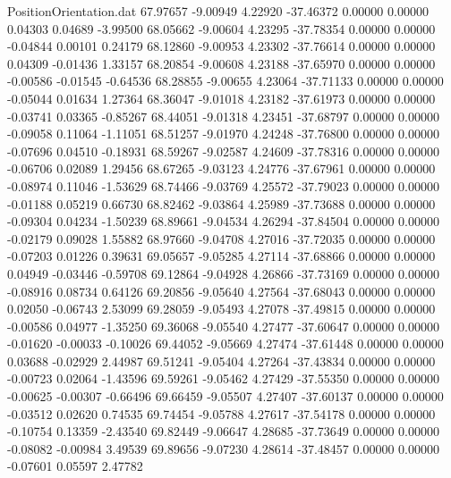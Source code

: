 \begin{filecontents}{PositionOrientation.dat}
  67.97657   -9.00949    4.22920   -37.46372    0.00000    0.00000    0.04303    0.04689   -3.99500
  68.05662   -9.00604    4.23295   -37.78354    0.00000    0.00000   -0.04844    0.00101    0.24179
  68.12860   -9.00953    4.23302   -37.76614    0.00000    0.00000    0.04309   -0.01436    1.33157
  68.20854   -9.00608    4.23188   -37.65970    0.00000    0.00000   -0.00586   -0.01545   -0.64536
  68.28855   -9.00655    4.23064   -37.71133    0.00000    0.00000   -0.05044    0.01634    1.27364
  68.36047   -9.01018    4.23182   -37.61973    0.00000    0.00000   -0.03741    0.03365   -0.85267
  68.44051   -9.01318    4.23451   -37.68797    0.00000    0.00000   -0.09058    0.11064   -1.11051
  68.51257   -9.01970    4.24248   -37.76800    0.00000    0.00000   -0.07696    0.04510   -0.18931
  68.59267   -9.02587    4.24609   -37.78316    0.00000    0.00000   -0.06706    0.02089    1.29456
  68.67265   -9.03123    4.24776   -37.67961    0.00000    0.00000   -0.08974    0.11046   -1.53629
  68.74466   -9.03769    4.25572   -37.79023    0.00000    0.00000   -0.01188    0.05219    0.66730
  68.82462   -9.03864    4.25989   -37.73688    0.00000    0.00000   -0.09304    0.04234   -1.50239
  68.89661   -9.04534    4.26294   -37.84504    0.00000    0.00000   -0.02179    0.09028    1.55882
  68.97660   -9.04708    4.27016   -37.72035    0.00000    0.00000   -0.07203    0.01226    0.39631
  69.05657   -9.05285    4.27114   -37.68866    0.00000    0.00000    0.04949   -0.03446   -0.59708
  69.12864   -9.04928    4.26866   -37.73169    0.00000    0.00000   -0.08916    0.08734    0.64126
  69.20856   -9.05640    4.27564   -37.68043    0.00000    0.00000    0.02050   -0.06743    2.53099
  69.28059   -9.05493    4.27078   -37.49815    0.00000    0.00000   -0.00586    0.04977   -1.35250
  69.36068   -9.05540    4.27477   -37.60647    0.00000    0.00000   -0.01620   -0.00033   -0.10026
  69.44052   -9.05669    4.27474   -37.61448    0.00000    0.00000    0.03688   -0.02929    2.44987
  69.51241   -9.05404    4.27264   -37.43834    0.00000    0.00000   -0.00723    0.02064   -1.43596
  69.59261   -9.05462    4.27429   -37.55350    0.00000    0.00000   -0.00625   -0.00307   -0.66496
  69.66459   -9.05507    4.27407   -37.60137    0.00000    0.00000   -0.03512    0.02620    0.74535
  69.74454   -9.05788    4.27617   -37.54178    0.00000    0.00000   -0.10754    0.13359   -2.43540
  69.82449   -9.06647    4.28685   -37.73649    0.00000    0.00000   -0.08082   -0.00984    3.49539
  69.89656   -9.07230    4.28614   -37.48457    0.00000    0.00000   -0.07601    0.05597    2.47782

\end{filecontents}
